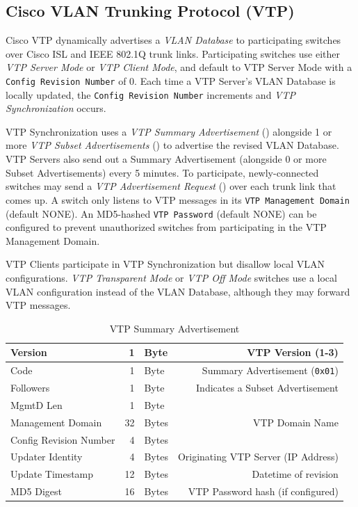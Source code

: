 \documentclass[12pt]{article}
\begin{document}
	\subsection[Cisco VTP]{Cisco VLAN Trunking Protocol (VTP) \label{subsec:CISCO VTP}}
	Cisco VTP dynamically advertises a \textit{VLAN Database} to participating switches over Cisco ISL and IEEE 802.1Q trunk links. Participating switches use either \textit{VTP Server Mode} or \textit{VTP Client Mode}, and default to VTP Server Mode with a \texttt{Config Revision Number} of 0. Each time a VTP Server's VLAN Database is locally updated, the \texttt{Config Revision Number} increments and \textit{VTP Synchronization} occurs.

	VTP Synchronization uses a \textit{VTP Summary Advertisement} () alongside 1 or more \textit{VTP Subset Advertisements} () to advertise the revised VLAN Database. VTP Servers also send out a Summary Advertisement (alongside 0 or more Subset Advertisements) every 5 minutes. To participate, newly-connected switches may send a \textit{VTP Advertisement Request} () over each trunk link that comes up. A switch only listens to VTP messages in its \texttt{VTP Management Domain} (default NONE). An MD5-hashed \texttt{VTP Password} (default NONE) can be configured to prevent unauthorized switches from participating in the VTP Management Domain.

	VTP Clients participate in VTP Synchronization but disallow local VLAN configurations. \textit{VTP Transparent Mode} or \textit{VTP Off Mode} switches use a local VLAN configuration instead of the VLAN Database, although they may forward VTP messages.

	\begin{table}[H]
	\centering
	\caption{VTP Summary Advertisement \label{tab:VTP SUMMARY}}
	\begin{tabular}{| l | r @{ } l | r |}\hline
	Version				& 1	& Byte	& VTP Version (1-3)\\\hline
	Code					& 1	& Byte	& Summary Advertisement (\texttt{0x01})\\\hline
	Followers				& 1	& Byte	& Indicates a Subset Advertisement\\\hline
	MgmtD Len				& 1	& Byte	&\\\hline
	Management Domain		& 32	& Bytes	& VTP Domain Name\\\hline
	Config Revision Number	& 4	& Bytes	&\\\hline
	Updater Identity			& 4	& Bytes	& Originating VTP Server (IP Address)\\\hline
	Update Timestamp		& 12	& Bytes	& Datetime of revision\\\hline
	MD5 Digest				& 16	& Bytes	& VTP Password hash (if configured)\\\hline
	\end{tabular}\end{table}
\end{document}
